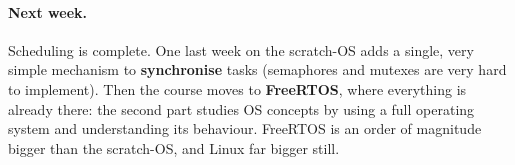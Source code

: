 \paragraph{Next week.} Scheduling is complete. One last week on the scratch-OS adds a single, very simple mechanism to \textbf{synchronise} tasks (semaphores and mutexes are very hard to implement). Then the course moves to \textbf{FreeRTOS}, where everything is already there: the second part studies OS concepts by using a full operating system and understanding its behaviour. FreeRTOS is an order of magnitude bigger than the scratch-OS, and Linux far bigger still.